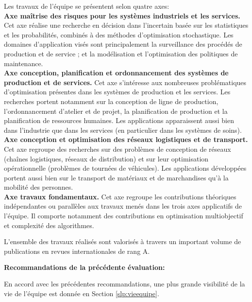 Les travaux de l'équipe se présentent selon quatre axes:\\
\textbf{Axe maîtrise des risques pour les systèmes industriels et les services.} 
    Cet axe réalise une recherche en décision dans l'incertain basée sur les statistiques et les probabilités, combinés à des méthodes d'optimisation stochastique.
    Les domaines d'application visés sont principalement 
    la surveillance des procédés de production et de service ; et
    la modélisation et l'optimisation des politiques de maintenance.\\
\textbf{Axe conception, planification et ordonnancement des systèmes de production et de services.}
Cet axe s'intéresse aux nombreuses problématiques d'optimisation présentes dans les systèmes de production et les services. 
Les recherches portent notamment sur la conception de ligne de production, l'ordonnancement d'atelier et de projet, la planification de production et la planification de ressources humaines. 
Les applications apparaissent aussi bien dans l'industrie que dans les services (en particulier dans les systèmes de soins).\\
\textbf{Axe conception et optimisation des réseaux logistiques et de transport.}
Cet axe regroupe des recherches sur des problèmes de conception de réseaux (chaînes logistiques, réseaux de distribution) et sur leur optimisation opérationnelle (problèmes de tournées de véhicules). 
Les applications développées portent aussi bien sur le transport de matériaux et de marchandises qu'à la mobilité des personnes. \\
\textbf{Axe travaux fondamentaux.}
Cet axe regroupe les contributions théoriques indépendantes ou parallèles aux travaux menés dans les trois axes applicatifs de l'équipe. 
Il comporte notamment des contributions en optimisation multiobjectif et complexité des algorithmes. %

L'ensemble des travaux réalisés sont valorisés à travers un important volume de publications en revues internationales de rang A.

\textbf{Recommandations de la précédente évaluation:}

En accord avec les précédentes recommandations, une plus grande visibilité de la vie de l'équipe est donnée en Section \ref{slp:vieequipe}.

